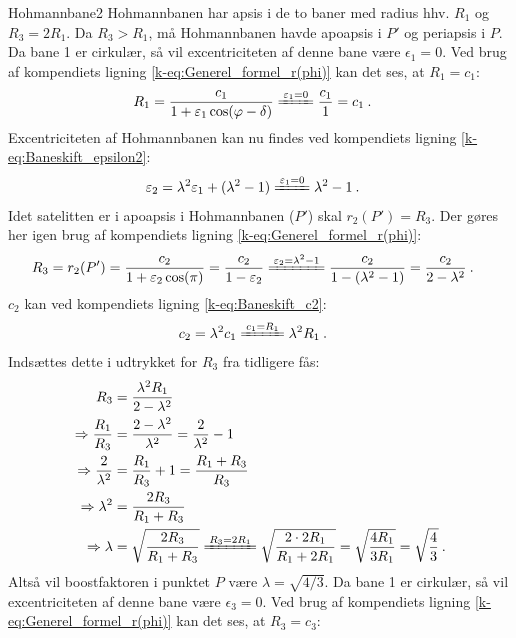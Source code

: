\begin{opgave}{Hohmannbane}{2}
\opg Hohmannbanen har apsis i de to baner med radius hhv. $R_1$ og $R_3 = 2R_1$. Da $R_3 > R_1$, må Hohmannbanen havde apoapsis i $P'$ og periapsis i $P$.
%
\opg Da bane 1 er cirkulær, så vil excentriciteten af denne bane være $\epsilon_1 = 0$. Ved brug af kompendiets ligning \eqref{k-eq:Generel_formel_r(phi)} kan det ses, at $R_1 = c_1$:
\begin{align*}
	R_1 &= \frac{c_1}{1+\epsilon_1\cos(\phi-\delta)}
	\xleq{\epsilon_1 = 0}
	\frac{c_1}{1} = c_1 \: .
\end{align*}
Excentriciteten af Hohmannbanen kan nu findes ved kompendiets ligning \eqref{k-eq:Baneskift_epsilon2}:
\begin{align*}
	\epsilon_2 &= \lambda^2\epsilon_1+(\lambda^2-1)
	\xleq{\epsilon_1 = 0}
	\lambda^2-1 \: .
\end{align*}
Idet satelitten er i apoapsis i Hohmannbanen ($P'$) skal $r_2(P') = R_3$. Der gøres her igen brug af kompendiets ligning \eqref{k-eq:Generel_formel_r(phi)}:
\begin{align*}
	R_3 &= r_2(P') = \frac{c_2}{1+\epsilon_2\cos(\pi)} = \frac{c_2}{1-\epsilon_2}
	\xleq{\epsilon_2 = \lambda^2-1}
	\frac{c_2}{1-(\lambda^2-1)} = \frac{c_2}{2-\lambda^2} \: .
\end{align*}
$c_2$ kan ved kompendiets ligning \eqref{k-eq:Baneskift_c2}:
\begin{align*}
	c_2 &= \lambda^2 c_1
	\xleq{c_1 = R_1}
	\lambda^2 R_1 \: .
\end{align*}
Indsættes dette i udtrykket for $R_3$ fra tidligere fås:
\begin{align*}
	R_3 &= \frac{\lambda^2 R_1}{2-\lambda^2} \\
	\Rightarrow \frac{R_1}{R_3} &= \frac{2-\lambda^2}{\lambda^2} = \frac{2}{\lambda^2} - 1 \\
	\Rightarrow \frac{2}{\lambda^2} &= \frac{R_1}{R_3} + 1 = \frac{R_1+R_3}{R_3} \\
	\Rightarrow \lambda^2 &= \frac{2R_3}{R_1+R_3} \\
	\Rightarrow \lambda &= \sqrt{\frac{2R_3}{R_1+R_3}}
	\xleq{R_3 = 2R_1}
	\sqrt{\frac{2 \cdot 2R_1}{R_1+2R_1}} = \sqrt{\frac{4R_1}{3R_1}} = \sqrt{\frac{4}{3}} \: .
\end{align*}
Altså vil boostfaktoren i punktet $P$ være $\lambda = \sqrt{4/3}$.
%
\opg Da bane 1 er cirkulær, så vil excentriciteten af denne bane være $\epsilon_3 = 0$. Ved brug af kompendiets ligning \eqref{k-eq:Generel_formel_r(phi)} kan det ses, at $R_3 = c_3$:
\begin{align*}

\end{align*}
\end{opgave}
